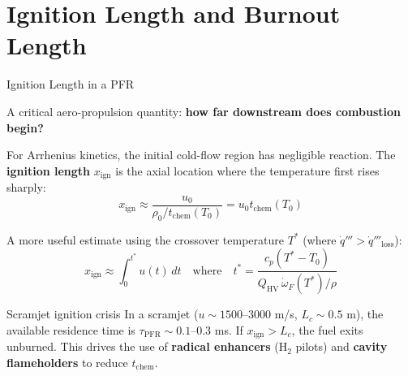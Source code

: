 \documentclass[12pt,aspectratio=169]{beamer}
\newcommand{\tchem}{t_{\text{chem}}}
\newcommand{\taupfr}{\tau_{\text{PFR}}}
\newcommand{\wdot}{\dot{\omega}}
\begin{document}
\section{Ignition Length and Burnout Length}

\begin{frame}{Ignition Length in a PFR}

  A critical aero-propulsion quantity: \textbf{how far downstream
  does combustion begin?}

  \medskip
  For Arrhenius kinetics, the initial cold-flow region has negligible
  reaction.  The \textbf{ignition length} $x_{\text{ign}}$ is the
  axial location where the temperature first rises sharply:
  \[
    x_{\text{ign}} \approx \frac{u_0}{\rho_0 / \tchem(T_0)}
    = u_0 \tchem(T_0)
  \]

  A more useful estimate using the crossover temperature $T^*$
  (where $\dot{q}''' > \dot{q}'''_{\text{loss}}$):
  \[
    x_{\text{ign}} \approx \int_0^{t^*} u(t)\,dt
    \quad\text{where}\quad
    t^* = \frac{c_p(T^* - T_0)}{Q_{\text{HV}}\,\wdot_F(T^*)/\rho}
  \]

  \begin{alertblock}{Scramjet ignition crisis}
    In a scramjet ($u \sim 1500$--$3000$ m/s, $L_c \sim 0.5$ m),
    the available residence time is $\taupfr \sim 0.1$--$0.3$ ms.
    If $x_{\text{ign}} > L_c$, the fuel exits unburned.
    This drives the use of \textbf{radical enhancers} (H$_2$ pilots)
    and \textbf{cavity flameholders} to reduce $\tchem$.
  \end{alertblock}
\end{frame}
\end{document}
